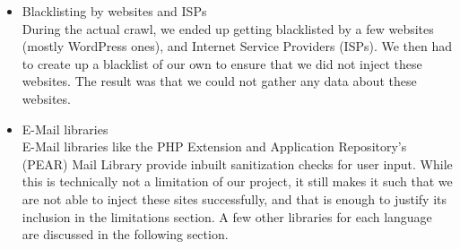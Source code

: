 \begin{itemize}
		\item Blacklisting by websites and ISPs\\
        During the actual crawl, we ended up getting blacklisted by a few websites (mostly WordPress ones), and Internet Service Providers (ISPs). We then had to create up a blacklist of our own to ensure that we did not inject these websites. The result was that we could not gather any data about these websites.
		
		\item E-Mail libraries\\
        E-Mail libraries like the PHP Extension and Application Repository's (PEAR) Mail Library provide inbuilt sanitization checks for user input. While this is technically not a limitation of our project, it still makes it such that we are not able to inject these sites successfully, and that is enough to justify its inclusion in the limitations section.
        A few other libraries for each language are discussed in the following section.
	\end{itemize}